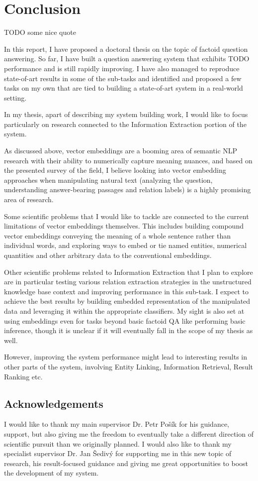 \chapter{Conclusion}
\label{ch:concl}

TODO some nice quote

In this report, I have proposed a doctoral thesis on the topic
of factoid question answering.
So far, I have built a question answering system that exhibits
TODO performance and is still rapidly improving.  I have also
managed to reproduce state-of-art results in some of the sub-tasks
and identified and proposed a few tasks on my own that are tied
to building a state-of-art system in a real-world setting.

In my thesis, apart of describing my system building work, I would
like to focus particularly on research connected to the Information Extraction
portion of the system.

As discussed above, vector embeddings are a booming area of semantic
NLP research with their ability to numerically capture meaning nuances,
and based on the presented survey of the field, I believe looking into
vector embedding approaches when manipulating natural text
(analyzing the question, understanding answer-bearing
passages and relation labels) is a highly promising area of research.

Some scientific problems that I would like to tackle are connected
to the current limitations of vector embeddings themselves.
This includes building compound vector embeddings conveying
the meaning of a whole sentence rather than individual words,
and
exploring ways to embed or tie named entities, numerical quantities
and other arbitrary data to the conventional embeddings.

Other scientific problems related to Information Extraction that
I plan to explore are in particular testing various relation
extraction strategies in the unstructured knowledge base context
and improving performance in this sub-task.
I expect to achieve the best results by building embedded
representation of the manipulated data and leveraging it within
the appropriate classifiers.
My sight is also set at using embeddings even
for tasks beyond basic factoid QA like performing basic inference,
though it is unclear if it will eventually fall in the scope of my
thesis as well.

However, improving the system performance might lead to interesting
results in other parts of the system, involving Entity Linking,
Information Retrieval, Result Ranking etc.

\section{Acknowledgements}

I would like to thank my main supervisor Dr. Petr Pošík
for his guidance, support, but also giving me the freedom to
eventually take a different direction of scientific pursuit
than we originally planned.
I would also like to thank my specialist supervisor Dr. Jan Šedivý
for supporting me in this new topic of research, his result-focused
guidance and giving me great opportunities to boost the development
of my system.

